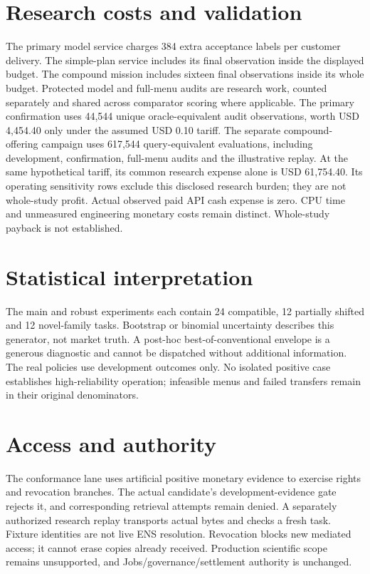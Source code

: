 \documentclass[10pt,letterpaper]{article}
\begin{document}
\section*{Research costs and validation}
The primary model service charges 384 extra acceptance labels per customer delivery. The simple-plan service includes its final observation inside the displayed budget. The compound mission includes sixteen final observations inside its whole budget. Protected model and full-menu audits are research work, counted separately and shared across comparator scoring where applicable. The primary confirmation uses 44,544 unique oracle-equivalent audit observations, worth USD 4,454.40 only under the assumed USD 0.10 tariff. The separate compound-offering campaign uses 617,544 query-equivalent evaluations, including development, confirmation, full-menu audits and the illustrative replay. At the same hypothetical tariff, its common research expense alone is USD 61,754.40. Its operating sensitivity rows exclude this disclosed research burden; they are not whole-study profit. Actual observed paid API cash expense is zero. CPU time and unmeasured engineering monetary costs remain distinct. Whole-study payback is not established.


\section*{Statistical interpretation}
The main and robust experiments each contain 24 compatible, 12 partially shifted and 12 novel-family tasks. Bootstrap or binomial uncertainty describes this generator, not market truth. A post-hoc best-of-conventional envelope is a generous diagnostic and cannot be dispatched without additional information. The real policies use development outcomes only. No isolated positive case establishes high-reliability operation; infeasible menus and failed transfers remain in their original denominators.

\section*{Access and authority}
The conformance lane uses artificial positive monetary evidence to exercise rights and revocation branches. The actual candidate's development-evidence gate rejects it, and corresponding retrieval attempts remain denied. A separately authorized research replay transports actual bytes and checks a fresh task. Fixture identities are not live ENS resolution. Revocation blocks new mediated access; it cannot erase copies already received. Production scientific scope remains unsupported, and Jobs/governance/settlement authority is unchanged.
\end{document}
